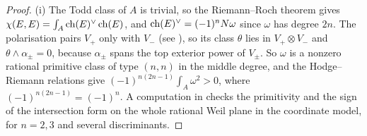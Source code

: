 \begin{proof}
(i) The Todd class of $A$ is trivial, so the Riemann--Roch theorem gives
$\chi(E,E)=\int_{A}\operatorname{ch}(E)^{\vee}\operatorname{ch}(E)$, and $\operatorname{ch}(E)^{\vee}=(-1)^{n}N\omega$
since $\omega$ has degree $2n$. The polarisation pairs $V_{+}$ only with
$V_{-}$ (see ), so its class $\theta$ lies in
$V_{+}\otimes V_{-}$ and $\theta\wedge\alpha_{\pm}=0$, because $\alpha_{\pm}$
spans the top exterior power of $V_{\pm}$. So $\omega$ is a nonzero rational
primitive class of type $(n,n)$ in the middle degree, and the Hodge--Riemann
relations give $(-1)^{n(2n-1)}\int_{A}\omega^{2}>0$, where
$(-1)^{n(2n-1)}=(-1)^{n}$. A computation in \cite{BMB26} checks the
primitivity and the sign of the intersection form on the whole rational Weil
plane in the coordinate model, for $n=2,3$ and several discriminants.


\end{proof}
